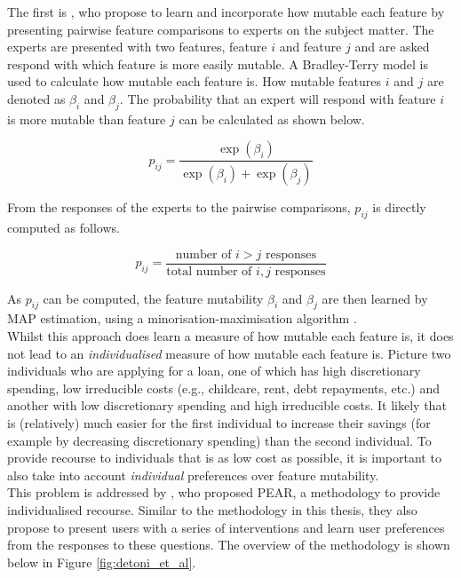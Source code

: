 The first is \textcite{rawalIndividualizedRecourseInterpretable2020}, who propose to learn and incorporate how mutable each feature by presenting pairwise feature comparisons to experts on the subject matter. The experts are presented with two features, feature $i$ and feature $j$ and are asked respond with which feature is more easily mutable. A Bradley-Terry model is used to calculate how mutable each feature is. How mutable features $i$ and $j$ are denoted as $\beta_i$ and $\beta_j$. The probability that an expert will respond with feature $i$ is more mutable than feature $j$ can be calculated as shown below.

\begin{equation}
	p_{ij} = \frac{\exp(\beta_i)}{\exp(\beta_i) + \exp(\beta_j)}
\end{equation}

From the responses of the experts to the pairwise comparisons, $p_{ij}$ is directly computed as follows. 

\begin{equation}
	p_{ij} = \frac{\text{number of } i>j \text{ responses}}{\text{total number of } i, j \text{ responses}}
\end{equation}

As $p_{ij}$ can be computed, the feature mutability $\beta_i$ and $\beta_j$ are then learned by MAP estimation, using a minorisation-maximisation algorithm \citep{caronEfficientBayesianInference2012}.\\

Whilst this approach does learn a measure of how mutable each feature is, it does not lead to an \textit{individualised} measure of how mutable each feature is. Picture two individuals who are applying for a loan, one of which has high discretionary spending, low irreducible costs (e.g., childcare, rent, debt repayments, etc.) and another with low discretionary spending and high irreducible costs. It likely that is (relatively) much easier for the first individual to increase their savings (for example by decreasing discretionary spending) than the second individual. To provide recourse to individuals that is as low cost as possible, it is important to also take into account \textit{individual} preferences over feature mutability.\\


This problem is addressed by \textcite{detoniPersonalizedAlgorithmicRecourse2023}, who proposed PEAR, a methodology to provide individualised recourse. Similar to the methodology in this thesis, they also propose to present users with a series of interventions and learn user preferences from the responses to these questions. The overview of the methodology is shown below in Figure \ref{fig:detoni_et_al}.

